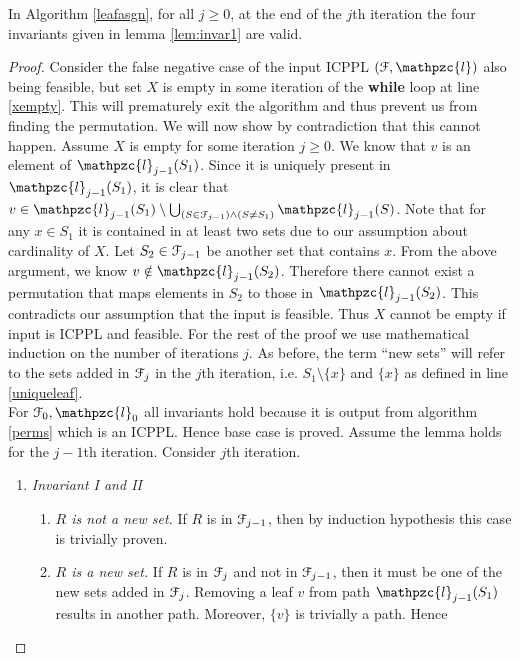 \documentclass[a4paper,UKenglish,numberwithinsect]{lipics} %
\def\cF{{\cal F}}
\def\cl{\mathpzc{l}}
\begin{document}
\begin{lemma}
\label{lem:invar3}
In Algorithm \ref{leafasgn}, for all $j \geq 0$, at the end of the
$j$th iteration the four invariants given in lemma \ref{lem:invar1}
are valid.  
\end{lemma}
\begin{proof}
  Consider the false negative case of the input ICPPL $(\cF, \cl)$
  also being feasible, but set $X$ is empty in some iteration of the
  {\bf while} loop at line \ref{xempty}. This will prematurely exit
  the algorithm and thus prevent us from finding the permutation.  We
  will now show by contradiction that this cannot happen. Assume $X$
  is empty for some iteration $j \ge 0$. We know that $v$ is an
  element of $\cl_{j-1}(S_1)$. Since it is uniquely present in
  $\cl_{j-1}(S_1)$, it is clear that $v \in \cl_{j-1}(S_1) \setminus
  \bigcup_{(S \in \cF_{j-1}) \wedge (S \ne S_1)}\cl_{j-1}(S)$.  Note
  that for any $x \in S_1$ it is contained in at least two sets due to
  our assumption about cardinality of $X$. Let $S_2 \in \cF_{j-1}$ be
  another set that contains $x$. From the above argument, we know $v
  \notin \cl_{j-1}(S_2)$. Therefore there cannot exist a permutation
  that maps elements in $S_2$ to those in $\cl_{j-1}(S_2)$. This
  contradicts our assumption that the input is feasible. Thus $X$
  cannot be empty if input is ICPPL and feasible.  For the rest of the
  proof we use mathematical induction on the number of iterations
  $j$. As before, the term ``new sets'' will refer to the sets added
  in $\cF_j$ in the $j$th iteration, i.e. $S_1
  \setminus \{x\}$ and $\{x\}$ as defined in line \ref{uniqueleaf}.\\
  For $\cF_0, \cl_0$ all invariants hold because it is output from
  algorithm \ref{perms} which is an ICPPL. Hence base case is proved.
  Assume the lemma holds for the $j-1$th iteration. Consider $j$th
  iteration.
  \noindent
  \begin{enumerate}[{Case }1:]
  \item {\em Invariant I and II}
    \begin{enumerate}[{Case 1.}1:]
    \item {\em $R$ is not a new set.} If $R$ is in $\cF_{j-1}$, then
      by induction hypothesis this case is trivially proven.
    \item {\em $R$ is a new set.} If $R$ is in $\cF_{j}$ and not in
      $\cF_{j-1}$, then it must be one of the new sets added in
      $\cF_j$. Removing a leaf $v$ from path $\cl_{j-1}(S_1)$ results
      in another path. Moreover, $\{v\}$ is trivially a path. Hence

\end{enumerate}
\end{enumerate}
\end{proof}
\end{document}
